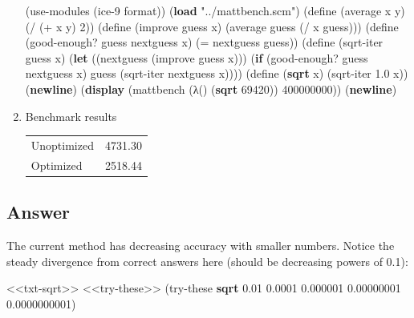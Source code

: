 \documentclass[
]{article}
\newenvironment{Shaded}{}{}
\newcommand{\DecValTok}[1]{\textcolor[rgb]{0.25,0.63,0.44}{#1}}
\newcommand{\ExtensionTok}[1]{#1}
\newcommand{\FloatTok}[1]{\textcolor[rgb]{0.25,0.63,0.44}{#1}}
\newcommand{\FunctionTok}[1]{\textcolor[rgb]{0.02,0.16,0.49}{#1}}
\newcommand{\KeywordTok}[1]{\textcolor[rgb]{0.00,0.44,0.13}{\textbf{#1}}}
\newcommand{\NormalTok}[1]{#1}
\newcommand{\OperatorTok}[1]{\textcolor[rgb]{0.40,0.40,0.40}{#1}}
\newcommand{\StringTok}[1]{\textcolor[rgb]{0.25,0.44,0.63}{#1}}
\begin{document}
\begin{enumerate}
\begin{Shaded}
\begin{Highlighting}[numbers=left,,]
\NormalTok{(use{-}modules (ice{-}9 format))}
\NormalTok{(}\KeywordTok{load} \StringTok{"../mattbench.scm"}\NormalTok{)}
\NormalTok{(}\ExtensionTok{define}\FunctionTok{ }\NormalTok{(average x y)}
\NormalTok{  (}\OperatorTok{/}\NormalTok{ (}\OperatorTok{+}\NormalTok{ x y) }\DecValTok{2}\NormalTok{))}
\NormalTok{(}\ExtensionTok{define}\FunctionTok{ }\NormalTok{(improve guess x)}
\NormalTok{  (average guess (}\OperatorTok{/}\NormalTok{ x guess)))}
\NormalTok{(}\ExtensionTok{define}\FunctionTok{ }\NormalTok{(good{-}enough? guess nextguess x)}
\NormalTok{  (}\OperatorTok{=}\NormalTok{ nextguess guess))}
\NormalTok{(}\ExtensionTok{define}\FunctionTok{ }\NormalTok{(sqrt{-}iter guess x)}
\NormalTok{  (}\KeywordTok{let}\NormalTok{ ((nextguess (improve guess x)))}
\NormalTok{    (}\KeywordTok{if}\NormalTok{ (good{-}enough? guess nextguess x)}
\NormalTok{        guess}
\NormalTok{        (sqrt{-}iter nextguess x))))}
\NormalTok{(}\ExtensionTok{define}\FunctionTok{ }\NormalTok{(}\KeywordTok{sqrt}\NormalTok{ x)}
\NormalTok{  (sqrt{-}iter }\FloatTok{1.0}\NormalTok{ x))}
\NormalTok{(}\KeywordTok{newline}\NormalTok{)}
\NormalTok{(}\KeywordTok{display}\NormalTok{ (mattbench (λ() (}\KeywordTok{sqrt} \DecValTok{69420}\NormalTok{)) }\DecValTok{400000000}\NormalTok{))}
\NormalTok{(}\KeywordTok{newline}\NormalTok{)}
\end{Highlighting}
\end{Shaded}
\item
  Benchmark results

  \begin{longtable}[]{@{}ll@{}}
  \toprule
  \endhead
  Unoptimized & 4731.30 \\
  Optimized & 2518.44 \\
  \bottomrule
  \end{longtable}
\end{enumerate}

\hypertarget{answer-6}{%
\subsection{Answer}\label{answer-6}}

The current method has decreasing accuracy with smaller numbers. Notice
the steady divergence from correct answers here (should be decreasing
powers of 0.1):

\hypertarget{EX1-7-t1}{%
\label{EX1-7-t1}}%
\begin{Shaded}
\begin{Highlighting}[numbers=left,,]
\NormalTok{\textless{}\textless{}txt{-}sqrt\textgreater{}\textgreater{}}
\NormalTok{\textless{}\textless{}try{-}these\textgreater{}\textgreater{}}
\NormalTok{(try{-}these }\KeywordTok{sqrt} \FloatTok{0.01} \FloatTok{0.0001} \FloatTok{0.000001} \FloatTok{0.00000001} \FloatTok{0.0000000001}\NormalTok{)}
\end{Highlighting}
\end{Shaded}
\end{document}
